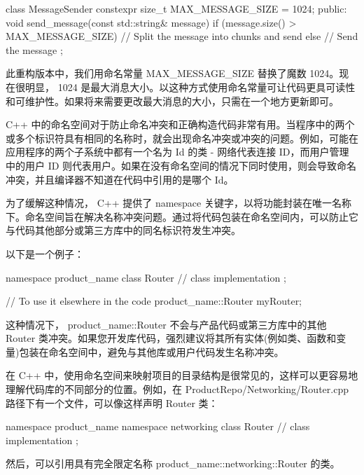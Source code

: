\begin{cpp}
class MessageSender {
    constexpr size_t MAX_MESSAGE_SIZE = 1024;
public:
    void send_message(const std::string& message) {
        if (message.size() > MAX_MESSAGE_SIZE) {
            // Split the message into chunks and send
        } else {
            // Send the message
        }
    }
};
\end{cpp}

此重构版本中，我们用命名常量 MAX\_MESSAGE\_SIZE 替换了魔数 1024。现在很明显， 1024 是最大消息大小。以这种方式使用命名常量可让代码更具可读性和可维护性。如果将来需要更改最大消息的大小，只需在一个地方更新即可。


C++ 中的命名空间对于防止命名冲突和正确构造代码非常有用。当程序中的两个或多个标识符具有相同的名称时，就会出现命名冲突或冲突的问题。例如，可能在应用程序的两个子系统中都有一个名为 Id 的类 - 网络代表连接 ID，而用户管理中的用户 ID 则代表用户。如果在没有命名空间的情况下同时使用，则会导致命名冲突，并且编译器不知道在代码中引用的是哪个 Id。

为了缓解这种情况， C++ 提供了 namespace 关键字，以将功能封装在唯一名称下。命名空间旨在解决名称冲突问题。通过将代码包装在命名空间内，可以防止它与代码其他部分或第三方库中的同名标识符发生冲突。

以下是一个例子：

\begin{cpp}
namespace product_name {
    class Router {
        // class implementation
    };
}

// To use it elsewhere in the code
product_name::Router myRouter;
\end{cpp}

这种情况下， product\_name::Router 不会与产品代码或第三方库中的其他 Router 类冲突。如果您开发库代码，强烈建议将其所有实体(例如类、函数和变量)包装在命名空间中，避免与其他库或用户代码发生名称冲突。

在 C++ 中，使用命名空间来映射项目的目录结构是很常见的，这样可以更容易地理解代码库的不同部分的位置。例如，在 ProductRepo/Networking/Router.cpp 路径下有一个文件，可以像这样声明 Router 类：

\begin{cpp}
namespace product_name {
    namespace networking {
        class Router {
            // class implementation
        };
    }
}
\end{cpp}

然后，可以引用具有完全限定名称 product\_name::networking::Router 的类。

